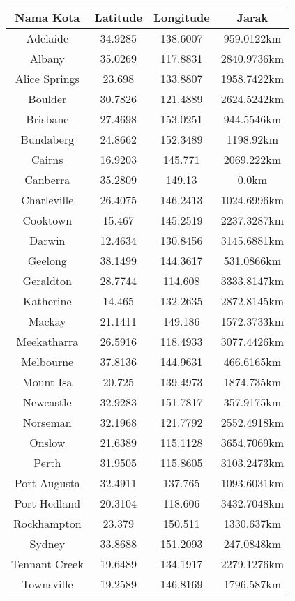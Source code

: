 \documentclass[12pt,a4paper]{article}
\begin{document}
\begin{table}[h]
    \centering
    \begin{tabular}{|c|c|c|c|}
        \hline
        \textbf{Nama Kota} & \textbf{Latitude} & \textbf{Longitude} & \textbf{Jarak} \\
        \hline
        Adelaide & 34.9285 & 138.6007 & 959.0122km \\
        Albany & 35.0269 & 117.8831 & 2840.9736km \\
        Alice Springs & 23.698 & 133.8807 & 1958.7422km \\
        Boulder & 30.7826 & 121.4889 & 2624.5242km \\
        Brisbane & 27.4698 & 153.0251 & 944.5546km \\
        Bundaberg & 24.8662 & 152.3489 & 1198.92km \\
        Cairns & 16.9203 & 145.771 & 2069.222km \\
        Canberra & 35.2809 & 149.13 & 0.0km \\
        Charleville & 26.4075 & 146.2413 & 1024.6996km \\
        Cooktown & 15.467 & 145.2519 & 2237.3287km \\
        Darwin & 12.4634 & 130.8456 & 3145.6881km \\
        Geelong & 38.1499 & 144.3617 & 531.0866km \\
        Geraldton & 28.7744 & 114.608 & 3333.8147km \\
        Katherine & 14.465 & 132.2635 & 2872.8145km \\
        Mackay & 21.1411 & 149.186 & 1572.3733km \\
        Meekatharra & 26.5916 & 118.4933 & 3077.4426km \\
        Melbourne & 37.8136 & 144.9631 & 466.6165km \\
        Mount Isa & 20.725 & 139.4973 & 1874.735km \\
        Newcastle & 32.9283 & 151.7817 & 357.9175km \\
        Norseman & 32.1968 & 121.7792 & 2552.4918km \\
        Onslow & 21.6389 & 115.1128 & 3654.7069km \\
        Perth & 31.9505 & 115.8605 & 3103.2473km \\
        Port Augusta & 32.4911 & 137.765 & 1093.6031km \\
        Port Hedland & 20.3104 & 118.606 & 3432.7048km \\
        Rockhampton & 23.379 & 150.511 & 1330.637km \\
        Sydney & 33.8688 & 151.2093 & 247.0848km \\
        Tennant Creek & 19.6489 & 134.1917 & 2279.1276km \\
        Townsville & 19.2589 & 146.8169 & 1796.587km \\
        \hline
    \end{tabular}
\end{table}
\end{document}
